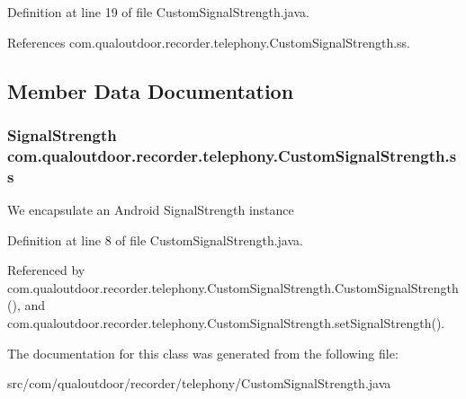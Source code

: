 Definition at line 19 of file Custom\-Signal\-Strength.\-java.



References com.\-qualoutdoor.\-recorder.\-telephony.\-Custom\-Signal\-Strength.\-ss.



\subsection{Member Data Documentation}
\hypertarget{classcom_1_1qualoutdoor_1_1recorder_1_1telephony_1_1CustomSignalStrength_aa3981bd9454f9a027a9b2f6697da62e3}{
\subsubsection[{ss}]{\setlength{\rightskip}{0pt plus 5cm}Signal\-Strength com.\-qualoutdoor.\-recorder.\-telephony.\-Custom\-Signal\-Strength.\-ss\hspace{0.3cm}{\ttfamily [private]}}}\label{classcom_1_1qualoutdoor_1_1recorder_1_1telephony_1_1CustomSignalStrength_aa3981bd9454f9a027a9b2f6697da62e3}
We encapsulate an Android Signal\-Strength instance 

Definition at line 8 of file Custom\-Signal\-Strength.\-java.



Referenced by com.\-qualoutdoor.\-recorder.\-telephony.\-Custom\-Signal\-Strength.\-Custom\-Signal\-Strength(), and com.\-qualoutdoor.\-recorder.\-telephony.\-Custom\-Signal\-Strength.\-set\-Signal\-Strength().



The documentation for this class was generated from the following file\-:\begin{DoxyCompactItemize}
\item 
src/com/qualoutdoor/recorder/telephony/Custom\-Signal\-Strength.\-java\end{DoxyCompactItemize}
